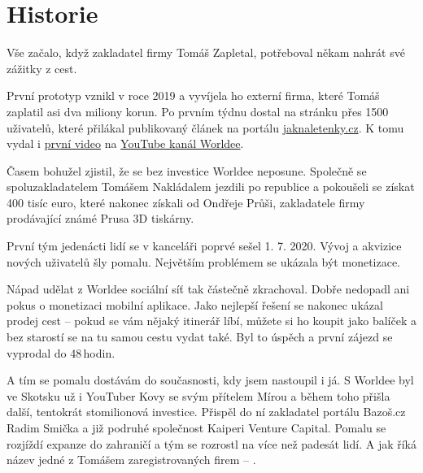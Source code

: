 \section{Historie}

Vše začalo, když zakladatel firmy Tomáš Zapletal, potřeboval někam nahrát své zážitky z cest.

\begin{displayquote}
\end{displayquote}

První prototyp vznikl v roce 2019 a vyvíjela ho externí firma, které Tomáš zaplatil asi dva miliony korun. Po prvním týdnu dostal na stránku přes 1500 uživatelů, které přilákal publikovaný článek na portálu \href{https://jaknaletenky.cz/cesky-startup-worldee-miri-do-sveta-a-potrebuje-vasi-pomoc.html}{jaknaletenky.cz}. K tomu vydal i \href{https://youtu.be/wJCV-5x0aIk}{první video} na \href{https://www.youtube.com/@worldee8910}{YouTube kanál Worldee}.

Časem bohužel zjistil, že se bez investice Worldee neposune. Společně se spoluzakladatelem Tomášem Nakládalem jezdili po republice a pokoušeli se získat 400 tisíc euro, které nakonec získali od Ondřeje Průši, zakladatele firmy prodávající známé Prusa 3D tiskárny.

První tým jedenácti lidí se v kanceláři poprvé sešel 1. 7. 2020. Vývoj a akvizice nových uživatelů šly pomalu. Největším problémem se ukázala být monetizace.

\begin{displayquote}
\end{displayquote}

Nápad udělat z Worldee sociální síť tak částečně zkrachoval. Dobře nedopadl ani pokus o monetizaci mobilní aplikace. Jako nejlepší řešení se nakonec ukázal prodej cest – pokud se vám nějaký itinerář líbí, můžete si ho koupit jako balíček a bez starostí se na tu samou cestu vydat také. Byl to úspěch a první zájezd se vyprodal do 48\,hodin.

A tím se pomalu dostávám do současnosti, kdy jsem nastoupil i já. S Worldee byl ve Skotsku už i YouTuber Kovy se svým přítelem Mírou\cite{WorldeeKovy} a během toho přišla další, tentokrát stomilionová investice.\cite{WorldeeInvestice} Přispěl do ní zakladatel portálu Bazoš.cz Radim Smička a již podruhé společnost Kaiperi Venture Capital. Pomalu se rozjíždí expanze do zahraničí a tým se rozrostl na více než padesát lidí. A jak říká název jedné z Tomášem zaregistrovaných firem – .\cite{Podnikani}
